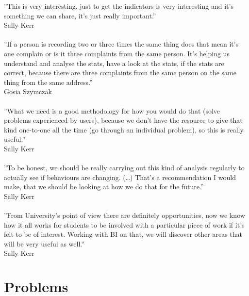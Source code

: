 ''This is very interesting, just to get the indicators is very interesting and it’s something we can share, it’s just really important.''\\
Sally Kerr\\\\
''If a person is recording two or three times the same thing does that mean it’s one complain or is it three complaints from the same person. It’s helping us understand and analyse the stats, have a look at the stats, if the stats are correct, because there are three complaints from the same person on the same thing from the same address.''\\
Gosia Szymczak\\\\
''What we need is a good methodology for how you would do that (solve problems experienced by users), because we don’t have the resource to give that kind one-to-one all the time (go through an individual problem), so this is really useful.''\\
Sally Kerr\\\\
''To be honest, we should be really carrying out this kind of analysis regularly to actually see if behaviours are changing. (…) That’s a recommendation I would make, that we should be looking at how we do that for the future.''\\
Sally Kerr\\\\
''From University’s point of view there are definitely opportunities, now we know how it all works for students to be involved with a particular piece of work if it’s felt to be of interest. Working with BI on that, we will discover other areas that will be very useful as well.''\\
Sally Kerr\\

	\section{Problems}
	
